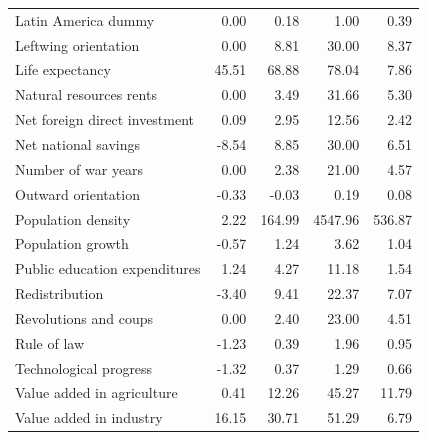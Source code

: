 \begin{refsection}
\begin{subappendices}
\begin{table}[!ht]
\begin{tabular}{lrrrr}
      Latin America dummy & 0.00 & 0.18 & 1.00 & 0.39 \\ 
      Leftwing orientation & 0.00 & 8.81 & 30.00 & 8.37 \\ 
      Life expectancy & 45.51 & 68.88 & 78.04 & 7.86 \\ 
      Natural resources rents & 0.00 & 3.49 & 31.66 & 5.30 \\ 
      Net foreign direct investment & 0.09 & 2.95 & 12.56 & 2.42 \\ 
      Net national savings & -8.54 & 8.85 & 30.00 & 6.51 \\ 
      Number of war years & 0.00 & 2.38 & 21.00 & 4.57 \\ 
      Outward orientation & -0.33 & -0.03 & 0.19 & 0.08 \\ 
      Population density & 2.22 & 164.99 & 4547.96 & 536.87 \\ 
      Population growth & -0.57 & 1.24 & 3.62 & 1.04 \\ 
      Public education expenditures & 1.24 & 4.27 & 11.18 & 1.54 \\ 
      Redistribution & -3.40 & 9.41 & 22.37 & 7.07 \\ 
      Revolutions and coups & 0.00 & 2.40 & 23.00 & 4.51 \\ 
      Rule of law & -1.23 & 0.39 & 1.96 & 0.95 \\ 
      Technological progress & -1.32 & 0.37 & 1.29 & 0.66 \\ 
      Value added in agriculture & 0.41 & 12.26 & 45.27 & 11.79 \\ 
      Value added in industry & 16.15 & 30.71 & 51.29 & 6.79 \\
       \bottomrule
    \end{tabular}
    \end{table}
    \clearpage
    
    \eject \pdfpagewidth=18.53in \pdfpageheight=11.69in %
    \setlength\tabcolsep{2pt}
    

\end{subappendices}
\end{refsection}
